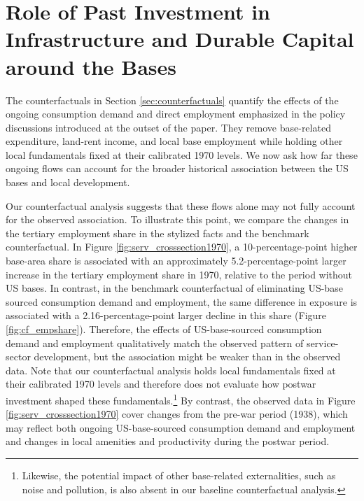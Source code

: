 \documentclass[12pt, unicode, a4paper]{article}
\newcommand{\1}{\mbox{1}\hspace{-0.25em}\mbox{l}} %
\begin{document}
\section{Role of Past Investment in Infrastructure and Durable Capital around the Bases}\label{sec:discussion_extensions}\label{sec:counterfactual_fundamentals}

The counterfactuals in Section \ref{sec:counterfactuals} quantify the effects of the ongoing consumption demand and direct employment emphasized in the policy discussions introduced at the outset of the paper. They remove base-related expenditure, land-rent income, and local base employment while holding other local fundamentals fixed at their calibrated 1970 levels. We now ask how far these ongoing flows can account for the broader historical association between the US bases and local development.

Our counterfactual analysis suggests that these flows alone may not fully account for the observed association.
To illustrate this point, we compare the changes in the tertiary employment share in the stylized facts and the benchmark counterfactual. In Figure \ref{fig:serv_crosssection1970}, a 10-percentage-point higher base-area share is associated with an approximately 5.2-percentage-point larger increase in the tertiary employment share in 1970, relative to the period without US bases.
In contrast, in the benchmark counterfactual of eliminating US-base sourced consumption demand and employment, the same difference in exposure is associated with a 2.16-percentage-point larger decline in this share (Figure \ref{fig:cf_empshare}).
Therefore, the effects of US-base-sourced consumption demand and employment qualitatively match the observed pattern of service-sector development, but the association might be weaker than in the observed data.
Note that our counterfactual analysis holds local fundamentals fixed at their calibrated 1970 levels and therefore does not evaluate how postwar investment shaped these fundamentals.\footnote{Likewise, the potential impact of other base-related externalities, such as noise and pollution, is also absent in our baseline counterfactual analysis.}
By contrast, the observed data in Figure \ref{fig:serv_crosssection1970} cover changes from the pre-war period (1938), which may reflect both ongoing US-base-sourced consumption demand and employment and changes in local amenities and productivity during the postwar period.
\end{document}
